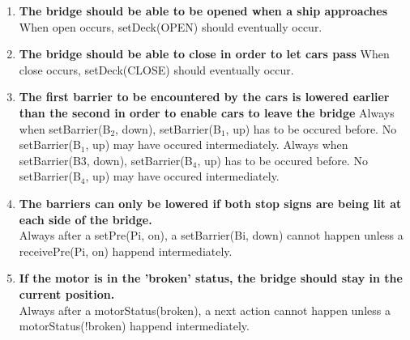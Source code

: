 \begin{enumerate}
	\item \textbf{The bridge should be able to be opened when a ship approaches}
	When open occurs, setDeck(OPEN) should eventually occur.

	\item \textbf{The bridge should be able to close in order to let cars pass}
	When close occurs, setDeck(CLOSE) should eventually occur.

	\item \textbf{The first barrier to be encountered by the cars is lowered earlier than the second in order to enable cars to leave the bridge}
	Always when setBarrier(B$_2$, down), setBarrier(B$_1$, up) has to be occured before. No setBarrier(B$_1$, up) may have occured intermediately.
	Always when setBarrier(B3, down), setBarrier(B$_4$, up) has to be occured before. No setBarrier(B$_4$, up) may have occured intermediately.
	
	\item \textbf{The barriers can only be lowered if both stop signs are being lit at each side of the bridge.} \\
	Always after a setPre(Pi, on), a setBarrier(Bi, down) cannot happen unless a receivePre(Pi, on) happend intermediately.

	\item \textbf{If the motor is in the 'broken' status, the bridge should stay in the current position.} \\
	Always after a motorStatus(broken), a next action cannot happen unless a motorStatus(!broken) happend intermediately.

\end{enumerate}
